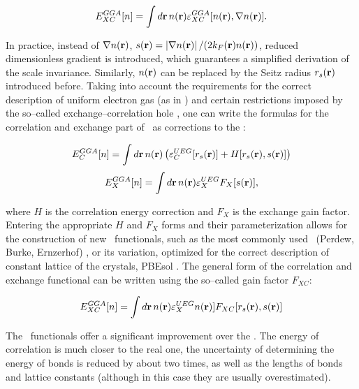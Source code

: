 \begin{equation}
    \label{Eq:general_GGA} 
    E_{XC}^{GGA}[n]=\int d\mathbf{r}\, n(\mathbf{r})\varepsilon_{XC}^{GGA}[n(\mathbf{r}),\nabla n(\mathbf{r})].
\end{equation}

In practice, instead of $\nabla n(\mathbf{r})$, $s(\mathbf{r})=\left|\nabla n(\mathbf{r}) \right|/(2k_F(\mathbf{r})n(\mathbf{r}))$, reduced dimensionless gradient is introduced, which guarantees a simplified derivation of the scale invariance.
Similarly, $n(\mathbf{r})$ can be replaced by the Seitz radius $r_s(\mathbf{r})$ introduced before.
Taking into account the requirements for the correct description of uniform electron gas (as in \LDA) and certain restrictions imposed by the so--called exchange--correlation hole \cite{martin}, one can write the formulas for the correlation and exchange part of \GGA\ as corrections to the \LDA:

\begin{equation}
    \label{Eq:correlation_GGA} 
    E_{C}^{GGA}[n]=\int d\mathbf{r}\, n(\mathbf{r})\left(\varepsilon^{UEG}_{C}[r_s(\mathbf{r})]+H[r_s(\mathbf{r}),s(\mathbf{r})]\right)
\end{equation}
\begin{equation}
    \label{Eq:exchange_GGA} 
    E_{X}^{GGA}[n]=\int d\mathbf{r}\, n(\mathbf{r})\varepsilon^{UEG}_{X}F_X[s(\mathbf{r})],
\end{equation}

where $H$ is the correlation energy correction and $F_X$ is the exchange gain factor.
Entering the appropriate $H$ and $F_X$ forms and their parameterization allows for the construction of new \GGA\ functionals, such as the most commonly used \PBE\ (Perdew, Burke, Ernzerhof) \cite{pbe}, or its variation, optimized for the correct description of constant lattice of the crystals, PBEsol \cite{pbesol}.
The general form of the correlation and exchange functional can be written using the so--called gain factor $F_{XC}$:

\begin{equation}
    \label{Eq:enhancement_GGA} 
    E_{XC}^{GGA}[n]=\int d\mathbf{r}\, n(\mathbf{r})\varepsilon^{UEG}_{X}n(\mathbf{r})]F_{XC}[r_s(\mathbf{r}),s(\mathbf{r})]
\end{equation}

The \GGA\ functionals offer a significant improvement over the \LDA.
The energy of correlation is much closer to the real one, the uncertainty of determining the energy of bonds is reduced by about two times, as well as the lengths of bonds and lattice constants (although in this case they are usually overestimated).


